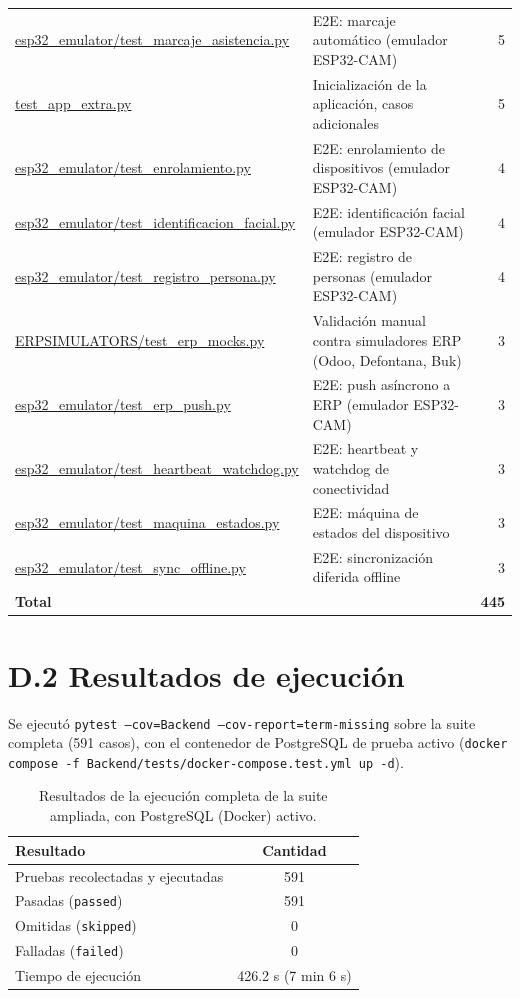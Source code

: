 \documentclass{iccmemoria}
\begin{document}
\begin{table}[H]
\begin{tabular}{@{}p{4.0cm}p{6.6cm}r@{}}
\url{esp32_emulator/test_marcaje_asistencia.py} & E2E: marcaje automático (emulador ESP32-CAM) & 5 \\
\url{test_app_extra.py} & Inicialización de la aplicación, casos adicionales & 5 \\
\url{esp32_emulator/test_enrolamiento.py} & E2E: enrolamiento de dispositivos (emulador ESP32-CAM) & 4 \\
\url{esp32_emulator/test_identificacion_facial.py} & E2E: identificación facial (emulador ESP32-CAM) & 4 \\
\url{esp32_emulator/test_registro_persona.py} & E2E: registro de personas (emulador ESP32-CAM) & 4 \\
\url{ERPSIMULATORS/test_erp_mocks.py} & Validación manual contra simuladores ERP (Odoo, Defontana, Buk) & 3 \\
\url{esp32_emulator/test_erp_push.py} & E2E: push asíncrono a ERP (emulador ESP32-CAM) & 3 \\
\url{esp32_emulator/test_heartbeat_watchdog.py} & E2E: heartbeat y watchdog de conectividad & 3 \\
\url{esp32_emulator/test_maquina_estados.py} & E2E: máquina de estados del dispositivo & 3 \\
\url{esp32_emulator/test_sync_offline.py} & E2E: sincronización diferida offline & 3 \\
\midrule
\multicolumn{2}{l}{\textbf{Total}} & \textbf{445} \\
\bottomrule
\end{tabular}
\end{table}


\section*{D.2 Resultados de ejecución}

Se ejecutó \texttt{pytest --cov=Backend --cov-report=term-missing} sobre la suite completa (591 casos), con el contenedor de PostgreSQL de prueba activo (\texttt{docker compose -f Backend/tests/docker-compose.test.yml up -d}).

\begin{table}[H]
\centering
\begin{tabular}{|l|c|}
\hline
\textbf{Resultado} & \textbf{Cantidad} \\
\hline
Pruebas recolectadas y ejecutadas & 591 \\
\hline
Pasadas (\texttt{passed}) & 591 \\
\hline
Omitidas (\texttt{skipped}) & 0 \\
\hline
Falladas (\texttt{failed}) & 0 \\
\hline
Tiempo de ejecución & 426.2 s (7 min 6 s) \\
\hline
\end{tabular}
\caption{Resultados de la ejecución completa de la suite ampliada, con PostgreSQL (Docker) activo.}
\label{tab:anexoD_resultados_full}
\end{table}
\end{document}
